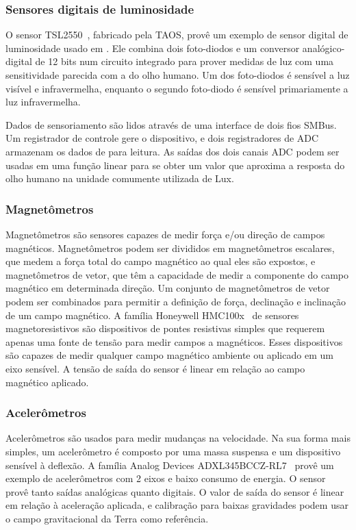 \subsubsection{Sensores digitais de luminosidade}

O sensor TSL2550~\cite{TAOS:TSL:2005}, fabricado pela TAOS, provê um exemplo de
sensor digital de luminosidade usado em \rssf. Ele combina dois foto-diodos e um
conversor analógico-digital de 12 bits num circuito integrado para prover
medidas de luz com uma sensitividade parecida com a do olho humano. Um dos
foto-diodos é sensível a luz visível e infravermelha, enquanto o segundo
foto-diodo é sensível primariamente a luz infravermelha.

Dados de sensoriamento são lidos através de uma interface de dois fios SMBus. Um
registrador de controle gere o dispositivo, e dois registradores de ADC
armazenam os dados de para leitura. As saídas dos dois canais ADC podem ser
usadas em uma função linear para se obter um valor que aproxima a resposta do
olho humano na unidade comumente utilizada de Lux.

\subsubsection{Magnetômetros}

Magnetômetros são sensores capazes de medir força e/ou direção de campos
magnéticos. Magnetômetros podem ser divididos em magnetômetros escalares, que
medem a força total do campo magnético ao qual eles são expostos, e
magnetômetros de vetor, que têm a capacidade de medir a componente do campo
magnético em determinada direção. Um conjunto de magnetômetros de vetor podem
ser combinados para permitir a definição de força, declinação e inclinação de um
campo magnético. A família Honeywell HMC100x~\cite{Honeywell:HMC:2005} de sensores
magnetoresistivos são dispositivos de pontes resistivas simples que requerem
apenas uma fonte de tensão para medir campos a magnéticos. Esses dispositivos
são capazes de medir qualquer campo magnético ambiente ou aplicado em um eixo
sensível. A tensão de saída do sensor é linear em relação ao campo magnético
aplicado.

\subsubsection{Acelerômetros}

Acelerômetros são usados para medir mudanças na velocidade. Na sua forma mais
simples, um acelerômetro é composto por uma massa suspensa e um dispositivo
sensível à deflexão. A família Analog Devices
ADXL345BCCZ-RL7~\cite{Analog:ADXL345:2009} provê um exemplo de acelerômetros com
2 eixos e baixo consumo de energia. O sensor provê tanto saídas analógicas
quanto digitais. O valor de saída do sensor é linear em relação à aceleração
aplicada, e calibração para baixas gravidades podem usar o campo gravitacional
da Terra como referência.

